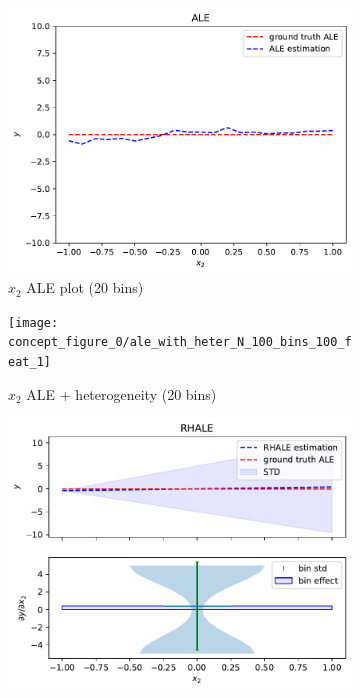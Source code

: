 \documentclass{ecai}  %
\begin{document}
\begin{figure}
    \centering
\begin{subfigure}{.33\textwidth}
  \centering
  \includegraphics[width=1\textwidth]{concept_figure_0/ale_N_100_feat_1_bins_100}
  \caption{\(x_2\) ALE plot (20 bins)}
  \label{fig:concept-figure-0-subfig-1}
\end{subfigure}%
\begin{subfigure}{.33\textwidth}
  \centering
  \texttt{[image: concept\_figure\_0/ale\_with\_heter\_N\_100\_bins\_100\_feat\_1]}
  \caption{\(x_2\) ALE + heterogeneity (20 bins)}
  \label{fig:concept-figure-0-subfig-2}
\end{subfigure}
\begin{subfigure}{.33\textwidth}
  \centering
  \includegraphics[width=1\textwidth]{concept_figure_0/rhale_N_100_feat_1}

\end{subfigure}
\end{figure}
\end{document}
